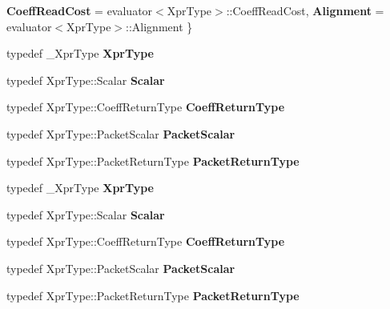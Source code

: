 \begin{DoxyCompactItemize}
{\bfseries Coeff\+Read\+Cost} = evaluator$<$Xpr\+Type$>$\+:\+:Coeff\+Read\+Cost, 
{\bfseries Alignment} = evaluator$<$Xpr\+Type$>$\+:\+:Alignment
 \}
\item 
\mbox{\label{class_eigen_1_1internal_1_1redux__evaluator_acc45bdab9b8f02fe19a183cd18dccaa6}} 
typedef \+\_\+\+Xpr\+Type {\bfseries Xpr\+Type}
\item 
\mbox{\label{class_eigen_1_1internal_1_1redux__evaluator_a1bf8a7092dd7275c5d575ad536c29a94}} 
typedef Xpr\+Type\+::\+Scalar {\bfseries Scalar}
\item 
\mbox{\label{class_eigen_1_1internal_1_1redux__evaluator_a23b1054b9d1aa504024ca69d9830b9fa}} 
typedef Xpr\+Type\+::\+Coeff\+Return\+Type {\bfseries Coeff\+Return\+Type}
\item 
\mbox{\label{class_eigen_1_1internal_1_1redux__evaluator_a40654b5cbdcd571f0587dcdadfddae19}} 
typedef Xpr\+Type\+::\+Packet\+Scalar {\bfseries Packet\+Scalar}
\item 
\mbox{\label{class_eigen_1_1internal_1_1redux__evaluator_a21a1cc38bfef69466788453f7f416662}} 
typedef Xpr\+Type\+::\+Packet\+Return\+Type {\bfseries Packet\+Return\+Type}
\item 
\mbox{\label{class_eigen_1_1internal_1_1redux__evaluator_acc45bdab9b8f02fe19a183cd18dccaa6}} 
typedef \+\_\+\+Xpr\+Type {\bfseries Xpr\+Type}
\item 
\mbox{\label{class_eigen_1_1internal_1_1redux__evaluator_a1bf8a7092dd7275c5d575ad536c29a94}} 
typedef Xpr\+Type\+::\+Scalar {\bfseries Scalar}
\item 
\mbox{\label{class_eigen_1_1internal_1_1redux__evaluator_a23b1054b9d1aa504024ca69d9830b9fa}} 
typedef Xpr\+Type\+::\+Coeff\+Return\+Type {\bfseries Coeff\+Return\+Type}
\item 
\mbox{\label{class_eigen_1_1internal_1_1redux__evaluator_a40654b5cbdcd571f0587dcdadfddae19}} 
typedef Xpr\+Type\+::\+Packet\+Scalar {\bfseries Packet\+Scalar}
\item 
\mbox{\label{class_eigen_1_1internal_1_1redux__evaluator_a21a1cc38bfef69466788453f7f416662}} 
typedef Xpr\+Type\+::\+Packet\+Return\+Type {\bfseries Packet\+Return\+Type}
\end{DoxyCompactItemize}
